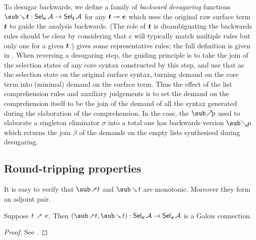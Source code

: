 To desugar backwards, we define a family of \textit{backward desugaring} functions $\desugarBwdR{\raw{t}}: \Sel{\raw{e}}{A} \to \Sel{\raw{t}}{A}$ for any $\bm{t} \twoheadrightarrow \bm{e}$ which uses the original raw surface term $\bm{t}$ to guide the analysis backwards. (The role of $\bm{t}$ is disambiguating the backwards rules should be clear by considering that $e$ will typically match multiple rules but only one for a given $\bm{t}$.)  gives some representative rules; the full definition is {\ifappendices given in  \else \IncludedWithSupplementaryMaterial.\fi} When reversing a desugaring step, the guiding principle is to take the join of the selection states of any core syntax constructed by this step, and use that as the selection state on the original surface syntax, turning demand on the core term into (minimal) demand on the surface term. Thus the effect of the list comprehension rules and auxiliary judgements is to set the demand on the comprehension itself to be the join of the demand of all the syntax generated during the elaboration of the comprehension. In the  case, the $\totaliseFwdR{p}$ used to elaborate a singleton eliminator $\sigma$ into a total one has backwards version $\totaliseBwdR{p}$ which returns the join $\beta$ of the demands on the empty lists synthesised during desugaring.

\subsection{Round-tripping properties}

It is easy to verify that $\desugarFwdF{t}$ and $\desugarBwdF{t}$ are monotonic. Moreover they form an adjoint pair.

\begin{theorem}
  \label{thm:surface-language:desugar:gc}
     Suppose $t \desugarFwdR e$. Then $(\desugarFwdF{t}, \desugarBwdF{t}): \Sel{\raw{e}}{A} \to \Sel{\raw{s}}{A}$ is a Galois connection.
\end{theorem}

\begin{proof}
   \ifappendices See . \else \ProofInSupplementaryMaterial \fi
\end{proof}
